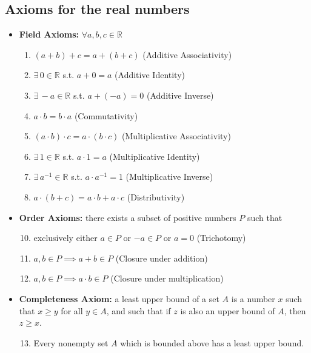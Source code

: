 \documentclass[12pt]{report}
\newcommand{\R}{\mathbb{R}}
\begin{document}
    \subsection*{Axioms for the real numbers}
        \begin{itemize}
            \item \textbf{Field Axioms:} $\forall a, b, c \in \R$
            \begin{enumerate}
                \item $(a + b) + c = a + (b + c)$ (Additive Associativity)
                \item $\exists\, 0 \in \R$ s.t. $a + 0 = a$ (Additive Identity)
                \item $\exists\, -a \in \R$ s.t. $a + (-a) = 0$ (Additive Inverse)
                \item $a \cdot b = b \cdot a$ (Commutativity)
                \item $(a \cdot b) \cdot c = a \cdot (b \cdot c)$ (Multiplicative Associativity)
                \item $\exists\, 1 \in \R$ s.t. $a \cdot 1 = a$ (Multiplicative Identity)
                \item $\exists\, a^{-1} \in \R$ s.t. $a \cdot a^{-1} = 1$ (Multiplicative Inverse)
                \item $a \cdot (b + c) = a \cdot b + a \cdot c$ (Distributivity)
            \end{enumerate}

            \item \textbf{Order Axioms:} there exists a subset of positive numbers $P$ such that 
            \begin{enumerate}
                \setcounter{enumi}{9}
                \item exclusively either $a \in P$ or $-a \in P$ or $a = 0$ (Trichotomy) 
                \item $a, b \in P \implies a + b \in P$ (Closure under addition)
                \item $a, b \in P \implies a \cdot b \in P$ (Closure under multiplication)
            \end{enumerate}

            \item \textbf{Completeness Axiom:} a least upper bound of a set $A$ is a number $x$ such that $x \geq y$ for all $y \in A$, and such that if $z$ is also an upper bound of $A$, then $z \geq x$. 
            \begin{enumerate}
                \setcounter{enumi}{12}
                \item Every nonempty set $A$ which is bounded above has a least upper bound. 
            \end{enumerate}
        \end{itemize}
\end{document}
